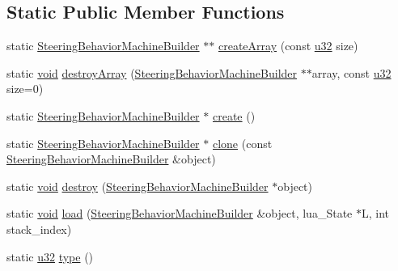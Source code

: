 \subsection*{Static Public Member Functions}
\begin{DoxyCompactItemize}
\item 
static \mbox{\hyperlink{classnjli_1_1_steering_behavior_machine_builder}{Steering\+Behavior\+Machine\+Builder}} $\ast$$\ast$ \mbox{\hyperlink{classnjli_1_1_steering_behavior_machine_builder_a60d1b7890a0bcca4aa4e02ee2873083a}{create\+Array}} (const \mbox{\hyperlink{_util_8h_a10e94b422ef0c20dcdec20d31a1f5049}{u32}} size)
\item 
static \mbox{\hyperlink{_thread_8h_af1e856da2e658414cb2456cb6f7ebc66}{void}} \mbox{\hyperlink{classnjli_1_1_steering_behavior_machine_builder_abaf463e018aa0fed6453cc828945b91c}{destroy\+Array}} (\mbox{\hyperlink{classnjli_1_1_steering_behavior_machine_builder}{Steering\+Behavior\+Machine\+Builder}} $\ast$$\ast$array, const \mbox{\hyperlink{_util_8h_a10e94b422ef0c20dcdec20d31a1f5049}{u32}} size=0)
\item 
static \mbox{\hyperlink{classnjli_1_1_steering_behavior_machine_builder}{Steering\+Behavior\+Machine\+Builder}} $\ast$ \mbox{\hyperlink{classnjli_1_1_steering_behavior_machine_builder_ac7ee8b61a32009690b6a09b2f654c846}{create}} ()
\item 
static \mbox{\hyperlink{classnjli_1_1_steering_behavior_machine_builder}{Steering\+Behavior\+Machine\+Builder}} $\ast$ \mbox{\hyperlink{classnjli_1_1_steering_behavior_machine_builder_a16ab8af15f21b7d376fec378f5741193}{clone}} (const \mbox{\hyperlink{classnjli_1_1_steering_behavior_machine_builder}{Steering\+Behavior\+Machine\+Builder}} \&object)
\item 
static \mbox{\hyperlink{_thread_8h_af1e856da2e658414cb2456cb6f7ebc66}{void}} \mbox{\hyperlink{classnjli_1_1_steering_behavior_machine_builder_ad07f36443d63f799dcea45529984f592}{destroy}} (\mbox{\hyperlink{classnjli_1_1_steering_behavior_machine_builder}{Steering\+Behavior\+Machine\+Builder}} $\ast$object)
\item 
static \mbox{\hyperlink{_thread_8h_af1e856da2e658414cb2456cb6f7ebc66}{void}} \mbox{\hyperlink{classnjli_1_1_steering_behavior_machine_builder_ae4cc741faa94a42df2bd7c12e20d416d}{load}} (\mbox{\hyperlink{classnjli_1_1_steering_behavior_machine_builder}{Steering\+Behavior\+Machine\+Builder}} \&object, lua\+\_\+\+State $\ast$L, int stack\+\_\+index)
\item 
static \mbox{\hyperlink{_util_8h_a10e94b422ef0c20dcdec20d31a1f5049}{u32}} \mbox{\hyperlink{classnjli_1_1_steering_behavior_machine_builder_ac68b89458678051ae996b1a006511425}{type}} ()
\end{DoxyCompactItemize}
